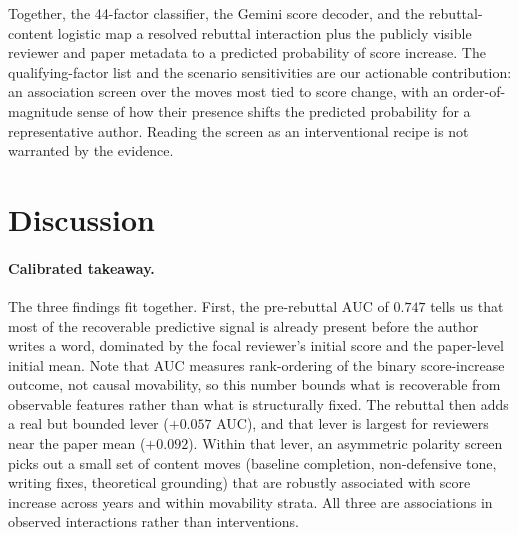 \documentclass{article}
\newcommand{\auc}{\text{AUC}}
\begin{document}
Together, the 44-factor classifier, the Gemini score decoder, and the rebuttal-content logistic map a resolved rebuttal interaction plus the publicly visible reviewer and paper metadata to a predicted probability of score increase. The qualifying-factor list and the scenario sensitivities are our actionable contribution: an association screen over the moves most tied to score change, with an order-of-magnitude sense of how their presence shifts the predicted probability for a representative author. Reading the screen as an interventional recipe is not warranted by the evidence.

\section{Discussion}\label{sec:discussion}


\paragraph{Calibrated takeaway.}
The three findings fit together. First, the pre-rebuttal $\auc$ of $0.747$ tells us that most of the recoverable predictive signal is already present before the author writes a word, dominated by the focal reviewer's initial score and the paper-level initial mean. Note that AUC measures rank-ordering of the binary score-increase outcome, not causal movability, so this number bounds what is recoverable from observable features rather than what is structurally fixed. The rebuttal then adds a real but bounded lever ($+0.057$ AUC), and that lever is largest for reviewers near the paper mean ($+0.092$). Within that lever, an asymmetric polarity screen picks out a small set of content moves (baseline completion, non-defensive tone, writing fixes, theoretical grounding) that are robustly associated with score increase across years and within movability strata. All three are associations in observed interactions rather than interventions.
\end{document}

